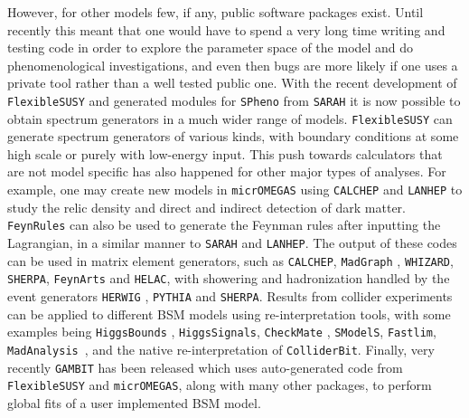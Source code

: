 \documentclass[final,3p,11pt,pdflatex]{elsarticle}
\makeatletter
\newcommand{\sarah}{\texttt{SARAH}\@\xspace}
\newcommand{\spheno}{\texttt{SPheno}\@\xspace}
\newcommand{\fs}{\texttt{FlexibleSUSY}\@\xspace}
\newcommand{\micromegas}{\texttt{micrOMEGAS}\@\xspace}
\newcommand{\calchep}{\texttt{CALCHEP}\@\xspace}
\newcommand{\lanhep}{\texttt{LANHEP}\@\xspace}
\newcommand{\madgraph}{\texttt{MadGraph}\@\xspace}
\newcommand{\whizard}{\texttt{WHIZARD}\@\xspace}
\newcommand{\sherpa}{\texttt{SHERPA}\@\xspace}
\newcommand{\FAFC}{\texttt{FeynArts}\@\xspace}
\newcommand{\helac}{\texttt{HELAC}\@\xspace}
\newcommand{\herwig}{\texttt{HERWIG}\@\xspace}
\newcommand{\pythia}{\texttt{PYTHIA}\@\xspace}
\newcommand{\checkmate}{\texttt{CheckMate}\@\xspace}
\newcommand{\madanalysis}{\texttt{MadAnalysis}\@\xspace}
\newcommand{\smodels}{\texttt{SModelS}\@\xspace}
\newcommand{\fastlim}{\texttt{Fastlim}\@\xspace}
\newcommand{\colliderbit}{\texttt{ColliderBit}\@\xspace}
\newcommand{\higgsbounds}{\texttt{HiggsBounds}\@\xspace}
\newcommand{\higgssignals}{\texttt{HiggsSignals}\@\xspace}
\newcommand{\FeynRules}{\texttt{FeynRules}\@\xspace}
\newcommand{\GAMBIT}{\texttt{GAMBIT}\@\xspace}
\makeatother
\begin{document}
However, for other models few, if any, public software packages exist.
Until recently this meant that one would have to spend a very long
time writing and testing code in order to explore the parameter space
of the model and do phenomenological investigations, and even then
bugs are more likely if one uses a private tool rather than a well
tested public one.  With the recent development of \fs and generated
modules for \spheno from \sarah \cite{Porod:2003um,
  Porod:2011nf,Staub:2017jnp,Staub:2009bi,Staub:2010jh,Staub:2012pb,
  Staub:2013tta,Athron:2014yba} it is now possible to obtain spectrum
generators in a much wider range of models.  \fs can generate spectrum
generators of various kinds, with boundary conditions at some high
scale or purely with low-energy input.  This push towards calculators
that are not model specific has also happened for other major types of
analyses.  For example, one may create new models in \micromegas
\cite{Belanger:2001fz,
  Belanger:2004yn,Belanger:2006is,Belanger:2008sj,Belanger:2010gh,
  Belanger:2013oya,Belanger:2014vza} using \calchep \cite{Boos:1994xb,
  Belyaev:2012qa} and \lanhep \cite{Semenov:1996es,Semenov:1998eb,
  Semenov:2002jw,Semenov:2008jy, Semenov:2010qt} to study the relic
density and direct and indirect detection of dark matter. \FeynRules
\cite{Christensen:2008py,Alloul:2013bka} can
also be used to generate the Feynman rules after inputting the
Lagrangian, in a similar manner to \sarah and \lanhep. The output of
these codes can be used in matrix element generators, such as \calchep,
\madgraph
\cite{Stelzer:1994ta,Maltoni:2002qb,Alwall:2007st,Alwall:2011uj,
  Alwall:2014hca}, \whizard \cite{Moretti:2001zz,Kilian:2007gr},
\sherpa \cite{Gleisberg:2003xi,Gleisberg:2008ta,Hoeche:2012yf}, \FAFC
\cite{Hahn:1998yk,Hahn:2000kx,Hahn:2006zy,Hahn:2010zi,Hahn:2016ebn}
and \helac \cite{Kanaki:2000ey,Cafarella:2007pc}, with showering and
hadronization handled by the event generators \herwig
\cite{Bahr:2008pv, Bellm:2015jjp}, \pythia
\cite{Bengtsson:1987kr,Sjostrand:2014zea, Sjostrand:2006za} and
\sherpa. Results from collider experiments can be applied to different
BSM models using re-interpretation tools, with some examples being \higgsbounds
\cite{Bechtle:2008jh,Bechtle:2011sb,Bechtle:2013wla, Bechtle:2015pma},
\higgssignals \cite{HiggsSignals}, \checkmate
\cite{Drees:2013wra,Dercks:2016npn}, \smodels \cite{Kraml:2013mwa,
  Kraml:2014sna,Ambrogi:2017neo}, \fastlim \cite{Papucci:2014rja},
\madanalysis\ \cite{Conte:2012fm,Conte:2014zja,Dumont:2014tja}, and
the native re-interpretation of \colliderbit \cite{Balazs:2017moi}.
Finally, very recently \GAMBIT \cite{Athron:2017ard} has been released
which uses auto-generated code from \fs \cite{Workgroup:2017bkh} and
\micromegas \cite{Workgroup:2017lvb}, along with many other packages,
to perform global fits of a user implemented BSM model.
\end{document}
